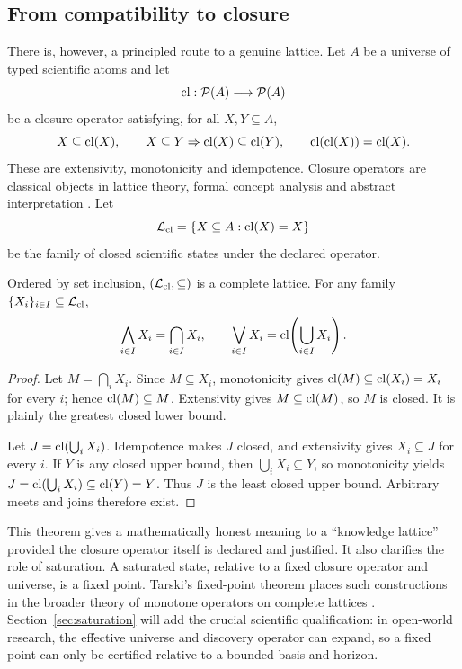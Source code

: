 \subsection{From compatibility to closure}

There is, however, a principled route to a genuine lattice. Let \(A\) be a universe of typed scientific atoms and let
\[
\operatorname{cl}:\mathcal P(A)\longrightarrow\mathcal P(A)
\]
be a closure operator satisfying, for all \(X,Y\subseteq A\),
\[
X\subseteq\operatorname{cl}(X),\qquad
X\subseteq Y\Rightarrow\operatorname{cl}(X)\subseteq\operatorname{cl}(Y),\qquad
\operatorname{cl}(\operatorname{cl}(X))=\operatorname{cl}(X).
\]
These are extensivity, monotonicity and idempotence. Closure operators are classical objects in lattice theory, formal concept analysis and abstract interpretation \cite{birkhoff1940,ganter1999,cousot1977}. Let
\[
\mathcal L_{\operatorname{cl}}=\{X\subseteq A:\operatorname{cl}(X)=X\}
\]
be the family of closed scientific states under the declared operator.

\begin{theorem}
Ordered by set inclusion, \((\mathcal L_{\operatorname{cl}},\subseteq)\) is a complete lattice. For any family \(\{X_i\}_{i\in I}\subseteq\mathcal L_{\operatorname{cl}}\),
\[
\bigwedge_{i\in I}X_i=\bigcap_{i\in I}X_i,
\qquad
\bigvee_{i\in I}X_i=\operatorname{cl}\!\left(\bigcup_{i\in I}X_i\right).
\]
\end{theorem}

\begin{proof}
Let \(M=\bigcap_i X_i\). Since \(M\subseteq X_i\), monotonicity gives \(\operatorname{cl}(M)\subseteq\operatorname{cl}(X_i)=X_i\) for every \(i\); hence \(\operatorname{cl}(M)\subseteq M\). Extensivity gives \(M\subseteq\operatorname{cl}(M)\), so \(M\) is closed. It is plainly the greatest closed lower bound.

Let \(J=\operatorname{cl}(\bigcup_i X_i)\). Idempotence makes \(J\) closed, and extensivity gives \(X_i\subseteq J\) for every \(i\). If \(Y\) is any closed upper bound, then \(\bigcup_i X_i\subseteq Y\), so monotonicity yields \(J=\operatorname{cl}(\bigcup_i X_i)\subseteq\operatorname{cl}(Y)=Y\). Thus \(J\) is the least closed upper bound. Arbitrary meets and joins therefore exist.
\end{proof}

This theorem gives a mathematically honest meaning to a ``knowledge lattice'' provided the closure operator itself is declared and justified. It also clarifies the role of saturation. A saturated state, relative to a fixed closure operator and universe, is a fixed point. Tarski's fixed-point theorem places such constructions in the broader theory of monotone operators on complete lattices \cite{tarski1955}. Section~\ref{sec:saturation} will add the crucial scientific qualification: in open-world research, the effective universe and discovery operator can expand, so a fixed point can only be certified relative to a bounded basis and horizon.

